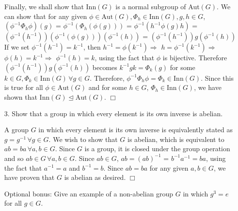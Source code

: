 \documentclass[12pt,letterpaper,reqno]{amsart}
\begin{document}
\begin{enumerate}
\begin{flushleft}
Finally, we shall show that Inn$(G)$ is a normal subgroup of Aut$(G)$. We can show that for any given $\phi \in \text{Aut}(G), \Phi_h \in \text{Inn}(G), g,h \in G$, $(\phi^{-1}\Phi_h\phi)(g)$ = $\phi^{-1}(\Phi_h(\phi(g)))$ = $\phi^{-1}(h^{-1}\phi(g)h)$ = $(\phi^{-1}(h^{-1}))(\phi^{-1}(\phi(g)))(\phi^{-1}(h))$ = $(\phi^{-1}(h^{-1}))g(\phi^{-1}(h))$ If we set $\phi^{-1}(h^{-1}) = k^{-1}$, then $h^{-1} = \phi(k^{-1}) \Rightarrow$ $h = \phi^{-1}(k^{-1}) \Rightarrow$ $\phi(h) = k^{-1} \Rightarrow$ $\phi^{-1}(h) = k$, using the fact that $\phi$ is bijective. Therefore $(\phi^{-1}(h^{-1}))g(\phi^{-1}(h))$ becomes $k^{-1}gk = \Phi_k(g)$ for some $k \in G, \Phi_k \in \text{Inn}(G)\, \forall g \in G$. Therefore, $\phi^{-1}\Phi_h\phi = \Phi_k \in \text{Inn}(G)$. Since this is true for all $\phi \in \text{Aut}(G)$ and for some $h \in G$, $\Phi_h \in \text{Inn}(G)$, we have shown that Inn$(G) \trianglelefteq \text{Aut}(G)$. $\Box$ 
\end{flushleft}
\newpage
\item[3.] Show that a group in which every element is its own inverse is abelian.
\newline

\begin{flushleft}
A group $G$ in which every element is its own inverse is equivalently stated as $g = g^{-1}\, \forall g \in G$. We wish to show that $G$ is abelian, which is equivalent to $ab = ba\, \forall a, b \in G$. Since $G$ is a group, it is closed under the group operation and so $ab \in G \, \forall a, b \in G$. Since $ab \in G$, $ab = (ab)^{-1}$ = $b^{-1}a^{-1} = ba$, using the fact that $a^{-1} = a$ and $b^{-1} = b$. Since $ab = ba$ for any given $a, b \in G$, we have proven that $G$ is abelian as desired. $\Box$
\end{flushleft}
\vspace{.2in}
\begin{flushleft}
Optional bonus: Give an example of a non-abelian group $G$ in which $g^3 = e$ for all $g \in G$.
\newline


\end{flushleft}
\end{enumerate}
\end{document}
